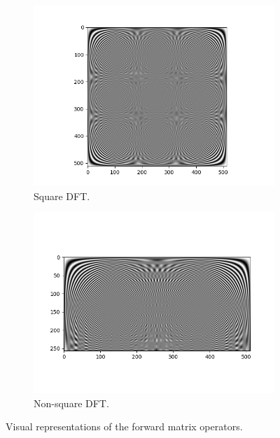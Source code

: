 \documentclass{article}
\begin{document}
\begin{figure}[ht]
	\centering
	\begin{subfigure}{.45\textwidth}
	  \centering
	  \includegraphics[width=\linewidth]{Figures/dft.png}
	  \caption{Square DFT.}
	  \label{fig:dft-square}
	\end{subfigure}
	\begin{subfigure}{.45\textwidth}
	  \centering
	  \includegraphics[width=\linewidth]{Figures/dft_non_square.png}
	  \caption{Non-square DFT.}
	  \label{fig:dft-non-square}
	\end{subfigure}
	\caption{Visual representations of the forward matrix operators.}
	\label{fig:dft}
\end{figure}
\end{document}
